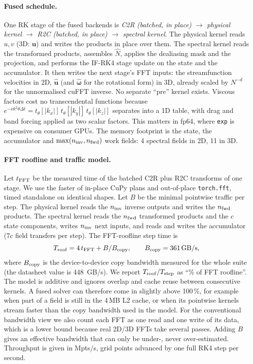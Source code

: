 \documentclass[11pt]{article}
\begin{document}
\paragraph{Fused schedule.} One RK stage of the fused backends is
\emph{C2R (batched, in place) $\to$ physical kernel $\to$ R2C (batched, in place) $\to$ spectral
kernel}. The physical kernel reads $u,v$ (3D: $\mathbf u$) and writes the products in place over
them. The spectral kernel reads the transformed products, assembles $\hat N$, applies the
dealiasing mask and the projection, and performs the IF-RK4 stage update on the state and the
accumulator. It then writes the next stage's FFT inputs: the streamfunction velocities in 2D,
$\hat{\mathbf u}$ (and $\hat{\boldsymbol\omega}$ for the rotational form) in 3D, already scaled
by $N^{-d}$ for the unnormalised cuFFT inverse. No separate ``pre'' kernel exists. Viscous
factors cost no transcendental functions because
$e^{-\nu k^2\theta\Delta t}=t_\theta[|k_x|]\,t_\theta[|k_y|]\,t_\theta[|k_z|]$ separates into a
1D table, with drag and band forcing applied as two scalar factors. This matters in fp64, where
\texttt{exp} is expensive on consumer GPUs. The memory footprint is the state, the accumulator
and $\max(n_{\rm inv},n_{\rm fwd})$ work fields: 4 spectral fields in 2D, 11 in 3D.

\paragraph{FFT roofline and traffic model.} Let $t_{\rm FFT}$ be the measured time of the
batched C2R plus R2C transforms of one stage. We use the faster of in-place CuPy plans and
out-of-place \texttt{torch.fft}, timed standalone on identical shapes. Let $B$ be the minimal
pointwise traffic per step. The physical kernel reads the $n_{\rm inv}$ inverse outputs and
writes the $n_{\rm fwd}$ products. The spectral kernel reads the $n_{\rm fwd}$ transformed
products and the $c$ state components, writes $n_{\rm inv}$ next inputs, and reads and writes the
accumulator ($7c$ field transfers per step). The FFT-roofline step time is
\begin{equation}
T_{\rm roof} = 4\,t_{\rm FFT} + B/B_{\rm copy},\qquad B_{\rm copy}=\SI{361}{GB/s},
\label{eq:roof}
\end{equation}
where $B_{\rm copy}$ is the device-to-device copy bandwidth measured for the whole suite (the
datasheet value is \SI{448}{GB/s}). We report $T_{\rm roof}/T_{\rm step}$ as ``\% of FFT
roofline''. The model is additive and ignores overlap and cache reuse between consecutive
kernels. A fused solver can therefore come in slightly above 100\,\%, for example when part
of a field is still in the 4\,MB L2 cache, or when its pointwise kernels stream faster than
the copy bandwidth used in the model. For the conventional bandwidth view we also count each FFT as one read and one
write of its data, which is a lower bound because real 2D/3D FFTs take several passes. Adding
$B$ gives an effective bandwidth that can only be under-, never over-estimated. Throughput is
given in Mpts/s, grid points advanced by one full RK4 step per second.
\end{document}
